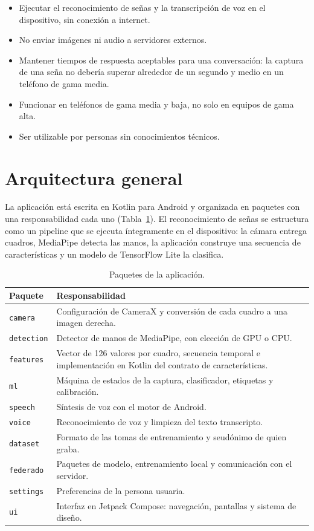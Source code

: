 \begin{itemize}
    \item Ejecutar el reconocimiento de señas y la transcripción de voz en el dispositivo, sin conexión a internet.
    \item No enviar imágenes ni audio a servidores externos.
    \item Mantener tiempos de respuesta aceptables para una conversación: la captura de una seña no debería superar alrededor de un segundo y medio en un teléfono de gama media.
    \item Funcionar en teléfonos de gama media y baja, no solo en equipos de gama alta.
    \item Ser utilizable por personas sin conocimientos técnicos.
\end{itemize}

\section{Arquitectura general}

La aplicación está escrita en Kotlin para Android y organizada en paquetes con una responsabilidad cada uno (Tabla~\ref{tab:paquetes}). El reconocimiento de señas se estructura como un pipeline que se ejecuta íntegramente en el dispositivo: la cámara entrega cuadros, MediaPipe detecta las manos, la aplicación construye una secuencia de características y un modelo de TensorFlow Lite la clasifica.

\begin{table}[h]
    \centering
    \small
    \begin{tabular}{lp{10cm}}
        \toprule
        Paquete & Responsabilidad \\
        \midrule
        \texttt{camera} & Configuración de CameraX y conversión de cada cuadro a una imagen derecha. \\
        \texttt{detection} & Detector de manos de MediaPipe, con elección de GPU o CPU. \\
        \texttt{features} & Vector de 126 valores por cuadro, secuencia temporal e implementación en Kotlin del contrato de características. \\
        \texttt{ml} & Máquina de estados de la captura, clasificador, etiquetas y calibración. \\
        \texttt{speech} & Síntesis de voz con el motor de Android. \\
        \texttt{voice} & Reconocimiento de voz y limpieza del texto transcripto. \\
        \texttt{dataset} & Formato de las tomas de entrenamiento y seudónimo de quien graba. \\
        \texttt{federado} & Paquetes de modelo, entrenamiento local y comunicación con el servidor. \\
        \texttt{settings} & Preferencias de la persona usuaria. \\
        \texttt{ui} & Interfaz en Jetpack Compose: navegación, pantallas y sistema de diseño. \\
        \bottomrule
    \end{tabular}
    \caption{Paquetes de la aplicación.}
    \label{tab:paquetes}
\end{table}

